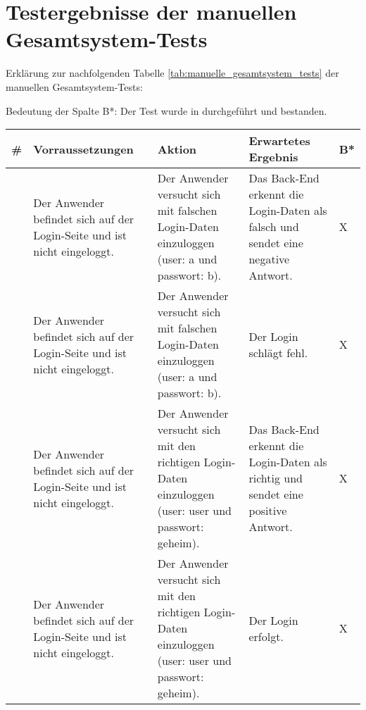 \chapter{Testergebnisse der manuellen Gesamtsystem-Tests}
\label{anhang_ergebnisse_systemtests}

Erklärung zur nachfolgenden Tabelle \ref{tab:manuelle_gesamtsystem_tests} der manuellen Gesamtsystem-Tests:\newline

Bedeutung der Spalte B*: Der Test wurde in durchgeführt und bestanden.

\vspace{0.5cm}

\begin{longtable}{| p{} | p{} | p{} | p{} | p{} |}
	\hline
	
	\textbf{\#} & \textbf{Vorraussetzungen} & \textbf{Aktion} & \textbf{Erwartetes Ergebnis} & \textbf{B*} \\ \hline
	
	\stepcounter{SysTestNumber}\arabic{SysTestNumber} & Der Anwender befindet sich auf der Login-Seite und ist nicht eingeloggt. & Der Anwender versucht sich mit falschen Login-Daten einzuloggen (user: a und passwort: b). & Das Back-End erkennt die Login-Daten als falsch und sendet eine negative Antwort. & X \\ \hline
	
	\stepcounter{SysTestNumber}\arabic{SysTestNumber} & Der Anwender befindet sich auf der Login-Seite und ist nicht eingeloggt. & Der Anwender versucht sich mit falschen Login-Daten einzuloggen (user: a und passwort: b). & Der Login schlägt fehl. & X \\ \hline
	
	\stepcounter{SysTestNumber}\arabic{SysTestNumber} & Der Anwender befindet sich auf der Login-Seite und ist nicht eingeloggt. & Der Anwender versucht sich mit den richtigen Login-Daten einzuloggen (user: user und passwort: geheim). & Das Back-End erkennt die Login-Daten als richtig und sendet eine positive Antwort. & X \\ \hline
	
	\stepcounter{SysTestNumber}\arabic{SysTestNumber} & Der Anwender befindet sich auf der Login-Seite und ist nicht eingeloggt. & Der Anwender versucht sich mit den richtigen Login-Daten einzuloggen (user: user und passwort: geheim). & Der Login erfolgt. & X \\ \hline
	

\end{longtable}
